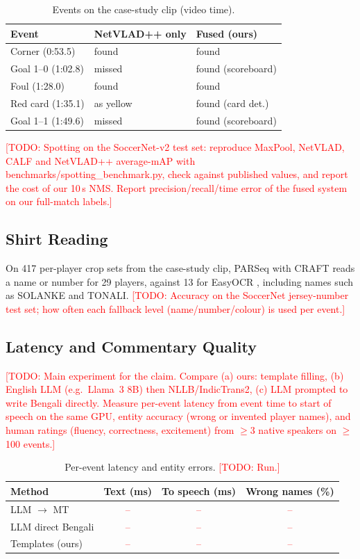 \documentclass[conference]{IEEEtran}
\newcommand{\todo}[1]{\textcolor{red}{[TODO: #1]}}
\newcommand{\tbd}{\textcolor{red}{--}}
\begin{document}
\begin{table}[t]
\centering
\caption{Events on the case-study clip (video time).}
\label{tab:events}
\begin{tabular}{lll}
\toprule
Event & NetVLAD++ only & Fused (ours) \\
\midrule
Corner (0:53.5) & found & found \\
Goal 1--0 (1:02.8) & missed & found (scoreboard) \\
Foul (1:28.0) & found & found \\
Red card (1:35.1) & as yellow & found (card det.) \\
Goal 1--1 (1:49.6) & missed & found (scoreboard) \\
\bottomrule
\end{tabular}
\end{table}

\todo{Spotting on the SoccerNet-v2 test set: reproduce MaxPool, NetVLAD, CALF and NetVLAD++ average-mAP with benchmarks/spotting\_benchmark.py, check against published values, and report the cost of our 10\,s NMS. Report precision/recall/time error of the fused system on our full-match labels.}

\subsection{Shirt Reading}
On 417 per-player crop sets from the case-study clip, PARSeq with CRAFT reads a name or number for 29 players, against 13 for EasyOCR \cite{jaidedai_easyocr}, including names such as SOLANKE and TONALI. \todo{Accuracy on the SoccerNet jersey-number test set; how often each fallback level (name/number/colour) is used per event.}

\subsection{Latency and Commentary Quality}
\todo{Main experiment for the claim. Compare (a) ours: template filling, (b) English LLM (e.g.\ Llama~3 8B) then NLLB/IndicTrans2, (c) LLM prompted to write Bengali directly. Measure per-event latency from event time to start of speech on the same GPU, entity accuracy (wrong or invented player names), and human ratings (fluency, correctness, excitement) from $\geq$3 native speakers on $\geq$100 events.}

\begin{table}[t]
\centering
\caption{Per-event latency and entity errors. \todo{Run.}}
\label{tab:latency}
\begin{tabular}{lccc}
\toprule
Method & Text (ms) & To speech (ms) & Wrong names (\%) \\
\midrule
LLM $\rightarrow$ MT & \tbd & \tbd & \tbd \\
LLM direct Bengali & \tbd & \tbd & \tbd \\
Templates (ours) & \tbd & \tbd & \tbd \\
\bottomrule
\end{tabular}
\end{table}
\end{document}
